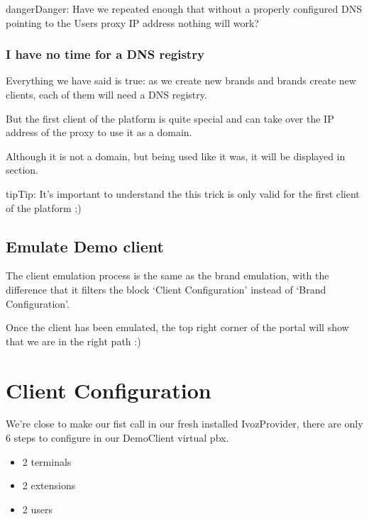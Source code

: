 \documentclass[letterpaper,10pt,english]{sphinxmanual}
\begin{document}
\begin{notice}{danger}{Danger:}
Have we repeated enough that without a properly configured DNS
pointing to the Users proxy IP address nothing will work?
\end{notice}


\subsubsection{I have no time for a DNS registry}
\label{getting_started/internal_calls/brand_portal:dnshack}\label{getting_started/internal_calls/brand_portal:i-have-no-time-for-a-dns-registry}
Everything we have said is true: as we create new brands and brands create new
clients, each of them will need a DNS registry.

But the first client of the platform is quite special and can take over the IP
address of the proxy to use it as a domain.

Although it is not a domain, but being used like it was, it will be displayed
in {\hyperref[administration_portal/platform/sip_domains:sip\string-domains]{}} section.

\begin{notice}{tip}{Tip:}
It’s important to understand the this trick is only valid for the first
client of the platform ;)
\end{notice}


\subsection{Emulate Demo client}
\label{getting_started/internal_calls/brand_portal:emulate-client}\label{getting_started/internal_calls/brand_portal:emulate-demo-client}
The client emulation process is the same as the brand emulation, with the
difference that it filters the block ‘Client Configuration’ instead of
‘Brand Configuration’.

Once the client has been emulated, the top right corner of the portal will
show that we are in the right path :)


\section{Client Configuration}
\label{getting_started/internal_calls/client_portal:client-configuration}\label{getting_started/internal_calls/client_portal::doc}\label{getting_started/internal_calls/client_portal:id1}
We're close to make our fist call in our fresh installed IvozProvider, there
are only 6 steps to configure in our DemoClient virtual pbx.
\begin{itemize}
\item {} 
2 terminals

\item {} 
2 extensions

\item {} 
2 users

\end{itemize}
\end{document}
